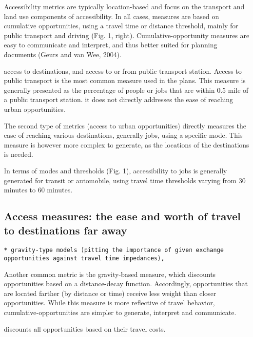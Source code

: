 \documentclass[12pt,]{article}
\begin{document}
Accessibility metrics are typically location-based and focus on the
transport and land use components of accessibility. In all cases,
measures are based on cumulative opportunities, using a travel time or
distance threshold, mainly for public transport and driving (Fig. 1,
right). Cumulative-opportunity measures are easy to communicate and
interpret, and thus better suited for planning documents (Geurs and van
Wee, 2004).

access to destinations, and access to or from public transport station.
Access to public transport is the most common measure used in the plans.
This measure is generally presented as the percentage of people or jobs
that are within 0.5 mile of a public transport station. it does not
directly addresses the ease of reaching urban opportunities.

The second type of metrics (access to urban opportunities) directly
measures the ease of reaching various destinations, generally jobs,
using a specific mode. This measure is however more complex to generate,
as the locations of the destinations is needed.

In terms of modes and thresholds (Fig. 1), accessibility to jobs is
generally generated for transit or automobile, using travel time
thresholds varying from 30 minutes to 60 minutes.

\hypertarget{access-measures-the-ease-and-worth-of-travel-to-destinations-far-away}{%
\subsection{Access measures: the ease and worth of travel to
destinations far
away}\label{access-measures-the-ease-and-worth-of-travel-to-destinations-far-away}}

\begin{verbatim}
* gravity-type models (pitting the importance of given exchange opportunities against travel time impedances), 
\end{verbatim}

Another common metric is the gravity-based measure, which discounts
opportunities based on a distance-decay function. Accordingly,
opportunities that are located farther (by distance or time) receive
less weight than closer opportunities. While this measure is more
reflective of travel behavior, cumulative-opportunities are simpler to
generate, interpret and communicate.

discounts all opportunities based on their travel costs.
\end{document}
